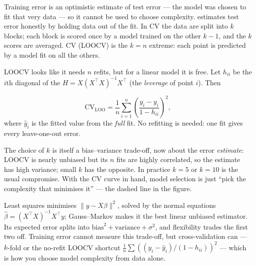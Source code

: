 \documentclass[11pt]{article}
\begin{document}
Training error is an optimistic estimate of test error --- the model was
chosen to fit that very data --- so it cannot be used to choose complexity.
 estimates test error honestly by holding data out
of the fit. In  CV the data are split into $k$ blocks; each
block is scored once by a model trained on the other $k-1$, and the $k$ scores
are averaged.  CV (LOOCV) is the $k=n$ extreme: each
point is predicted by a model fit on all the others.

LOOCV looks like it needs $n$ refits, but for a linear model it is free. Let
$h_{ii}$ be the $i$th diagonal of the 
$H = X(X^\top X)^{-1}X^\top$ (the \emph{leverage} of point $i$). Then

\begin{theorem}
\[
  \mathrm{CV}_{\text{LOO}}
    = \frac{1}{n}\sum_{i=1}^n \left(\frac{y_i - \hat y_i}{1 - h_{ii}}\right)^2,
\]
where $\hat y_i$ is the fitted value from the \emph{full} fit. No refitting is
needed: one fit gives every leave-one-out error.
\end{theorem}

\noindent The choice of $k$ is itself a bias--variance trade-off, now about
the error \emph{estimate}: LOOCV is nearly unbiased but its $n$ fits are
highly correlated, so the estimate has high variance; small $k$ has the
opposite. In practice $k=5$ or $k=10$ is the usual compromise. With the CV
curve in hand, model selection is just ``pick the complexity that minimises
it'' --- the dashed line in the figure.

\begin{summarybox}
Least squares minimises $\|y - X\beta\|^2$, solved by the normal equations
$\hat\beta = (X^\top X)^{-1}X^\top y$; Gauss--Markov makes it the best linear
unbiased estimator. Its expected error splits into
$\text{bias}^2 + \text{variance} + \sigma^2$, and flexibility trades the
first two off. Training error cannot measure this trade-off, but
cross-validation can --- $k$-fold or the no-refit LOOCV shortcut
$\frac1n\sum((y_i-\hat y_i)/(1-h_{ii}))^2$ --- which is how you choose model
complexity from data alone.
\end{summarybox}
\end{document}
